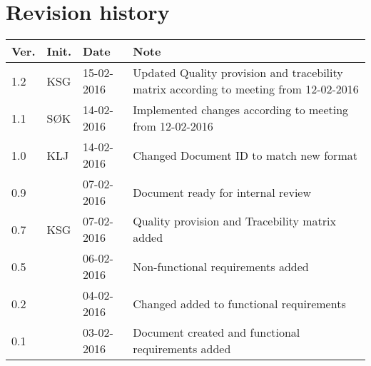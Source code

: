 \label{chp_revisionHistory}
\chapter{Revision history}

\begin{tabular}{b{1cm} b{1cm} b{2cm} b{8cm}}
    \textbf{Ver.} & \textbf{Init.} & \textbf{Date} & \textbf{Note} \\
    \hline
    1.2 & KSG & 15-02-2016 & Updated Quality provision and tracebility matrix according to meeting from 12-02-2016 \\
    1.1 & SØK & 14-02-2016 & Implemented changes according to meeting from 12-02-2016 \\ 
    1.0 & KLJ & 14-02-2016 & Changed Document ID to match new format \\
    0.9 &  & 07-02-2016 & Document ready for internal review \\
    0.7 & KSG & 07-02-2016 & Quality provision and Tracebility matrix added \\
    0.5 &  & 06-02-2016 & Non-functional requirements added \\
	0.2 &  & 04-02-2016 & Changed added to functional requirements \\
    0.1 &  & 03-02-2016 & Document created and functional requirements added  \\
\end{tabular}
